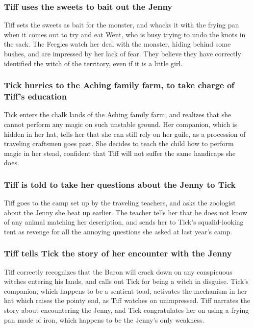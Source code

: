 \subsubsection{\Gls{Tiff} uses the sweets to bait out the \Gls{Jenny}}
\Gls{Tiff} sets the sweets as bait for the monster, and whacks it with the frying pan when it comes
out to try and eat \Gls{Went}, who is busy trying to undo the knots in the sack. The Feegles watch
her deal with the monster, hiding behind some bushes, and are impressed by her lack of fear. They
believe they have correctly identified the witch of the territory, even if it is a little girl.

\subsubsection{\Gls{Tick} hurries to the Aching family farm, to take charge of \Gls{Tiff}'s
    education}
\Gls{Tick} enters the chalk lands of the Aching family farm, and realizes that she cannot perform
any magic on such unstable ground. Her companion, which is hidden in her hat, tells her that she
can still rely on her guile, as a procession of traveling craftsmen goes past. She decides to
teach the child how to perform magic in her stead, confident that \Gls{Tiff} will not suffer the
same handicaps she does.

\subsubsection{\Gls{Tiff} is told to take her questions about the \Gls{Jenny} to \Gls{Tick}}
\Gls{Tiff} goes to the camp set up by the traveling teachers, and asks the zoologist about the
\Gls{Jenny} she beat up earlier. The teacher tells her that he does not know of any animal
matching her description, and sends her to \Gls{Tick}'s squalid-looking tent as revenge for all
the annoying questions she asked at last year's camp.

\subsubsection{\Gls{Tiff} tells \Gls{Tick} the story of her encounter with the \Gls{Jenny}}
\Gls{Tiff} correctly recognizes that the \Gls{Baron} will crack down on any conspicuous witches
entering his lands, and calls out \Gls{Tick} for being a witch in disguise. \Gls{Tick}'s companion,
which happens to be a sentient toad, activates the mechanism in her hat which raises the pointy
end, as \Gls{Tiff} watches on unimpressed. \Gls{Tiff} narrates the story about encountering the
\Gls{Jenny}, and \Gls{Tick} congratulates her on using a frying pan made of iron, which happens to
be the \Gls{Jenny}'s only weakness.

